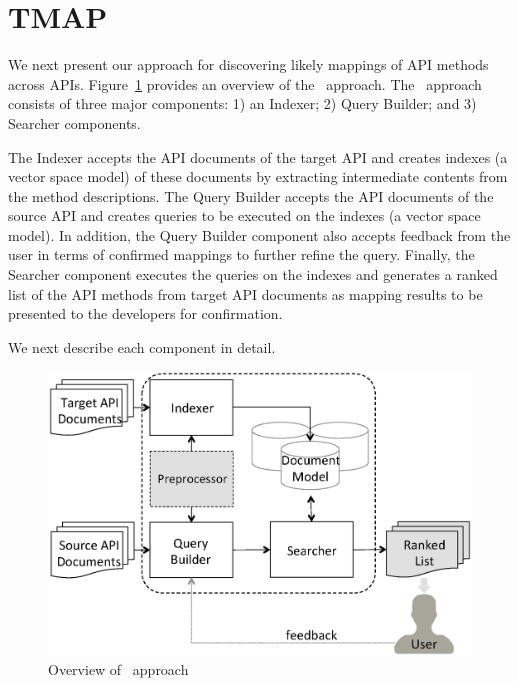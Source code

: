\section{TMAP}
\label{sec:approach}

We next present our approach for discovering 
likely mappings of API methods  across APIs. 
Figure~\ref{fig:approachOverview} provides an overview of the \tool\ approach.
The \tool\ approach consists of three major components: 1) an Indexer; 2) Query Builder; and 3) Searcher components.


The Indexer accepts the API documents of the target API
and creates indexes (a vector space model) of these documents 
by extracting intermediate contents from the method descriptions. 
The Query Builder accepts the API documents of the source API
and creates queries to be executed on the indexes (a vector space model).
In addition, the Query Builder component also accepts feedback from the
user in terms of confirmed mappings to further refine the query. 
Finally, the Searcher component executes the queries on the indexes and 
generates a ranked list of the API methods from target API documents as
mapping results to be presented to the developers for confirmation.

We next describe each component in detail.


\begin{figure}
	\begin{center}
		\includegraphics[scale=0.45]{ApproahOverview.eps}
		\caption{\label{fig:approachOverview} Overview of \tool\ approach}
	\end{center}
\end{figure}


